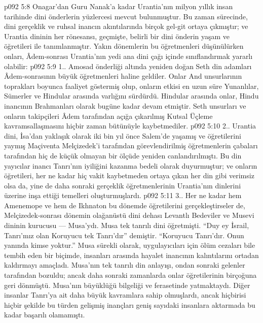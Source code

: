 \vs p092 5:8 Onagar’dan Guru Nanak’a kadar Urantia’nın milyon yıllık insan tarihinde dini önderlerin yüzlercesi mevcut bulunmuştur. Bu zaman sürecinde, dini gerçeklik ve ruhsal inancın akıntılarında birçok gel\hyp{}git ortaya çıkmıştır; ve Urantia dininin her rönesansı, geçmişte, belirli bir dini önderin yaşam ve öğretileri ile tanımlanmıştır. Yakın dönemlerin bu öğretmenleri düşünülürken onları, Âdem\hyp{}sonrası Urantia’nın yedi ana dini çağı içinde sınıflandırmak yararlı olabilir:
\vs p092 5:9 1.\bibnobreakspace {}. Amosad önderliği altında yeniden doğan Seth din adamları Âdem\hyp{}sonrasının büyük öğretmenleri haline geldiler. Onlar And unsurlarının toprakları boyunca faaliyet göstermiş olup, onların etkisi en uzun süre Yunanlılar, Sümerler ve Hindular arasında varlığını sürdürdü. Hindular arasında onlar, Hindu inancının Brahmanları olarak bugüne kadar devam etmiştir. Seth unsurları ve onların takipçileri Âdem tarafından açığa çıkarılmış Kutsal Üçleme kavramsallaşmasını hiçbir zaman bütünüyle kaybetmediler.
\vs p092 5:10 2.\bibnobreakspace {}. Urantia dini, İsa’dan yaklaşık olarak iki bin yıl önce Salem’de yaşamış ve öğretilerini yaymış Maçiventa Melçizedek’i tarafından görevlendirilmiş öğretmenlerin çabaları tarafından hiç de küçük olmayan bir ölçüde yeniden canlandırılmıştı. Bu din yayıcılar inancı Tanrı’nın iyiliğini kazanma bedeli olarak duyurmuştur; ve onların öğretileri, her ne kadar hiç vakit kaybetmeden ortaya çıkan her din gibi verimsiz olsa da, yine de daha sonraki gerçeklik öğretmenlerinin Urantia’nın dinlerini üzerine inşa ettiği temelleri oluşturmuşlardı.
\vs p092 5:11 3.\bibnobreakspace {}. Her ne kadar hem Amenemope ve hem de Ikhnaton bu dönemde öğretilerini gerçekleştirseler de, Melçizedek\hyp{}sonrası dönemin olağanüstü dini dehası Levantlı Bedeviler ve Musevi dininin kurucusu --- Musa’ydı. Musa tek tanrılı dini öğretmişti. “Duy ey İsrail, Tanrı’mız olan Koruyucu tek Tanrı’dır” demiştir. “Koruyucu Tanrı’dır. Onun yanında kimse yoktur.” Musa sürekli olarak, uygulayıcıları için ölüm cezaları bile tembih eden bir biçimde, insanları arasında hayalet inancının kalıntılarını ortadan kaldırmayı amaçladı. Musa’nın tek tanrılı din anlayışı, ondan sonraki gelenler tarafından bozuldu; ancak daha sonraki zamanlarda onlar öğretilerinin birçoğuna geri dönmüştü. Musa’nın büyüklüğü bilgeliği ve ferasetinde yatmaktaydı. Diğer insanlar Tanrı’ya ait daha büyük kavramlara sahip olmuşlardı, ancak hiçbirisi hiçbir şekilde bu türden gelişmiş inançları geniş sayıdaki insanlara aktarmada bu kadar başarılı olamamıştı.
